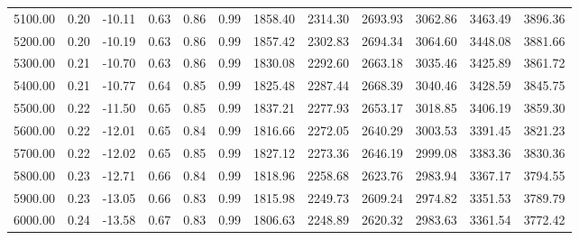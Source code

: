 \begin{table}[ht]
\begin{tabular}{rrrrrrrrrrrr}
  5100.00 & 0.20 & -10.11 & 0.63 & 0.86 & 0.99 & 1858.40 & 2314.30 & 2693.93 & 3062.86 & 3463.49 & 3896.36 \\ 
  5200.00 & 0.20 & -10.19 & 0.63 & 0.86 & 0.99 & 1857.42 & 2302.83 & 2694.34 & 3064.60 & 3448.08 & 3881.66 \\ 
  5300.00 & 0.21 & -10.70 & 0.63 & 0.86 & 0.99 & 1830.08 & 2292.60 & 2663.18 & 3035.46 & 3425.89 & 3861.72 \\ 
  5400.00 & 0.21 & -10.77 & 0.64 & 0.85 & 0.99 & 1825.48 & 2287.44 & 2668.39 & 3040.46 & 3428.59 & 3845.75 \\ 
  5500.00 & 0.22 & -11.50 & 0.65 & 0.85 & 0.99 & 1837.21 & 2277.93 & 2653.17 & 3018.85 & 3406.19 & 3859.30 \\ 
  5600.00 & 0.22 & -12.01 & 0.65 & 0.84 & 0.99 & 1816.66 & 2272.05 & 2640.29 & 3003.53 & 3391.45 & 3821.23 \\ 
  5700.00 & 0.22 & -12.02 & 0.65 & 0.85 & 0.99 & 1827.12 & 2273.36 & 2646.19 & 2999.08 & 3383.36 & 3830.36 \\ 
  5800.00 & 0.23 & -12.71 & 0.66 & 0.84 & 0.99 & 1818.96 & 2258.68 & 2623.76 & 2983.94 & 3367.17 & 3794.55 \\ 
  5900.00 & 0.23 & -13.05 & 0.66 & 0.83 & 0.99 & 1815.98 & 2249.73 & 2609.24 & 2974.82 & 3351.53 & 3789.79 \\ 
  6000.00 & 0.24 & -13.58 & 0.67 & 0.83 & 0.99 & 1806.63 & 2248.89 & 2620.32 & 2983.63 & 3361.54 & 3772.42 \\ 
   \hline
\end{tabular}
\end{table}
